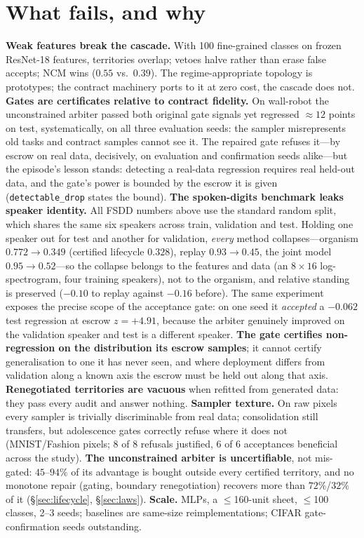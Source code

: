 \documentclass{article}
\begin{document}
\section{What fails, and why}\label{sec:fails}
\textbf{Weak features break the cascade.} With 100 fine-grained classes on
frozen ResNet-18 features, territories overlap; vetoes halve rather than
erase false accepts; NCM wins ($0.55$ vs.\ $0.39$). The regime-appropriate
topology is prototypes; the contract machinery ports to it at zero cost, the
cascade does not. \textbf{Gates are certificates relative to contract
fidelity.} On wall-robot the unconstrained arbiter passed both original gate
signals yet regressed $\approx\!12$ points on test, systematically, on all
three evaluation seeds: the sampler misrepresents old tasks and contract
samples cannot see it. The repaired gate refuses it---by escrow on real data,
decisively, on evaluation and confirmation seeds alike---but the episode's
lesson stands: detecting a real-data regression requires real held-out data,
and the gate's power is bounded by the escrow it is given
(\texttt{detectable\_drop} states the bound). \textbf{The spoken-digits benchmark leaks speaker identity.} All FSDD numbers
above use the standard random split, which shares the same six speakers across
train, validation and test. Holding one speaker out for test and another for
validation, \emph{every} method collapses---organism $0.772 \to 0.349$
(certified lifecycle $0.328$), replay $0.93 \to 0.45$, the joint model
$0.95 \to 0.52$---so the collapse belongs to the features and data (an
$8{\times}16$ log-spectrogram, four training speakers), not to the organism,
and relative standing is preserved ($-0.10$ to replay against $-0.16$ before).
The same experiment exposes the precise scope of the acceptance gate: on one
seed it \emph{accepted} a $-0.062$ test regression at escrow $z=+4.91$, because
the arbiter genuinely improved on the validation speaker and test is a
different speaker. \textbf{The gate certifies non-regression on the
distribution its escrow samples}; it cannot certify generalisation to one it
has never seen, and where deployment differs from validation along a known axis
the escrow must be held out along that axis. \textbf{Renegotiated
territories are vacuous} when refitted from generated data: they pass every
audit and answer nothing. \textbf{Sampler texture.} On raw pixels every
sampler is trivially discriminable from real data; consolidation still
transfers, but adolescence gates correctly refuse where it does not
(MNIST/Fashion pixels; 8 of 8 refusals justified, 6 of 6 acceptances
beneficial across the study). \textbf{The unconstrained arbiter is
uncertifiable}, not mis-gated: $45$--$94\%$ of its advantage is bought outside
every certified territory, and no monotone repair (gating, boundary
renegotiation) recovers more than $72\%$/$32\%$ of it
(\S\ref{sec:lifecycle}, \S\ref{sec:laws}). \textbf{Scale.} MLPs, a
$\le$160-unit sheet, $\le$100 classes, 2--3 seeds; baselines are same-size
reimplementations; CIFAR gate-confirmation seeds outstanding.
\end{document}
